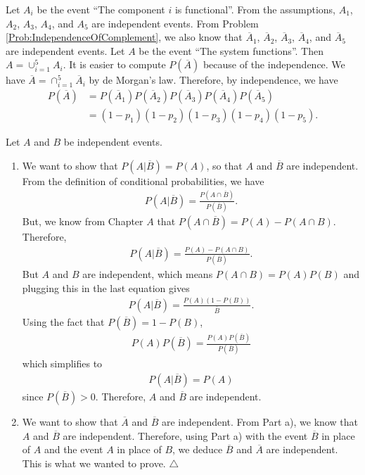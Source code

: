 	\begin{problem}
	Let $A_i$ be the event ``The component $i$ is functional''. From the assumptions, $A_1$, $A_2$, $A_3$, $A_4$, and $A_5$ are independent events. From Problem \ref{Prob:IndependenceOfComplement}, we also know that $\overline{A}_1$, $\overline{A}_2$, $\overline{A}_3$, $\overline{A}_4$, and $\overline{A}_5$ are independent events. Let $A$ be the event ``The system functions''. Then $A = \cup_{i = 1}^5 A_i$. It is easier to compute $P (\overline{A})$ because of the independence. We have $\overline{A} = \cap_{i = 1}^5 \overline{A}_i$ by de Morgan's law. Therefore, by independence, we have
		\begin{align*}
		P (\overline{A}) &= P (\overline{A}_1) P (\overline{A}_2) P (\overline{A}_3) P (\overline{A}_4) P (\overline{A}_5) \\
		&= (1 - p_1) (1 - p_2) (1 - p_3) (1 - p_4) (1 - p_5) . \tag*{$\triangle$}
		\end{align*}
	\end{problem}
	
	\begin{problem}\label{Prob:IndependenceOfComplement}
	Let $A$ and $B$ be independent events. 
	\begin{enumerate}[label=\alph*)]
	\item We want to show that $P (A | \overline{B}) = P (A)$, so that $A$ and $\overline{B}$ are independent. From the definition of conditional probabilities, we have
		\begin{align*}
		P (A | \overline{B}) = \frac{P (A \cap \overline{B})}{P (\overline{B})} .
		\end{align*} 
	But, we know from Chapter $A$ that $P (A \cap \overline{B}) = P (A) - P (A \cap B)$. Therefore,
		\begin{align*}
		P (A | \overline{B}) = \frac{P (A) - P (A \cap B)}{P (\overline{B})} .
		\end{align*} 
	But $A$ and $B$ are independent, which means $P (A \cap B) = P (A) P (B)$ and plugging this in the last equation gives
		\begin{align*}
		P (A | \overline{B}) = \frac{P (A) (1 - P (B))}{\overline{B}} .
		\end{align*} 
	Using the fact that $P (\overline{B}) = 1 - P (B)$,
		\begin{align*}
		P (A) P (\overline{B}) = \frac{P (A) P (\overline{B})}{P (\overline{B})}
		\end{align*}
	which simplifies to
		\begin{align*}
		P (A | \overline{B})  = P (A)
		\end{align*}
	since $P (\overline{B}) > 0$.
	Therefore, $A$ and $\overline{B}$ are independent. 
	\item We want to show that $\overline{A}$ and $\overline{B}$ are independent. From Part a), we know that $A$ and $\overline{B}$ are independent. Therefore, using Part a) with the event $\overline{B}$ in place of $A$ and the event $A$ in place of $B$, we deduce $\overline{B}$ and $\overline{A}$ are independent. This is what we wanted to prove. \hfill $\triangle$
	\end{enumerate}
	\end{problem}

